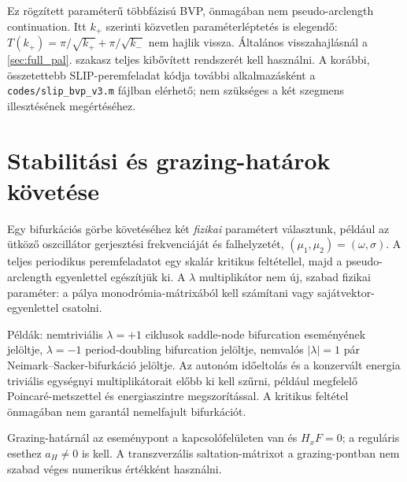 Ez rögzített paraméterű többfázisú BVP, önmagában nem pseudo-arclength continuation. Itt $k_+$ szerinti közvetlen paraméterléptetés is elegendő: $T(k_+)=\pi/\sqrt{k_+}+\pi/\sqrt{k_-}$ nem hajlik vissza. Általános visszahajlásnál a \ref{sec:full_pal}. szakasz teljes kibővített rendszerét kell használni. A korábbi, összetettebb SLIP-peremfeladat kódja további alkalmazásként a \texttt{codes/slip\_bvp\_v3.m} fájlban elérhető; nem szükséges a két szegmens illesztésének megértéséhez.
\exampleend

\section{Stabilitási és grazing-határok követése}
Egy bifurkációs görbe követéséhez két \emph{fizikai} paramétert választunk, például az ütköző oszcillátor gerjesztési frekvenciáját és falhelyzetét, $(\mu_1,\mu_2)=(\omega,\sigma)$. A teljes periodikus peremfeladatot egy skalár kritikus feltétellel, majd a pseudo-arclength egyenlettel egészítjük ki. A $\lambda$ multiplikátor nem új, szabad fizikai paraméter: a pálya monodrómia-mátrixából kell számítani vagy sajátvektor-egyenlettel csatolni.

Példák: nemtriviális $\lambda=+1$ ciklusok saddle-node bifurcation eseményének jelöltje, $\lambda=-1$ period-doubling bifurcation jelöltje, nemvalós $|\lambda|=1$ pár Neimark--Sacker-bifurkáció jelöltje. Az autonóm időeltolás és a konzervált energia triviális egységnyi multiplikátorait előbb ki kell szűrni, például megfelelő Poincaré-metszettel és energiaszintre megszorítással. A kritikus feltétel önmagában nem garantál nemelfajult bifurkációt.

Grazing-határnál az eseménypont a kapcsolófelületen van és $H_xF=0$; a reguláris esethez $a_H\neq0$ is kell. A transzverzális saltation-mátrixot a grazing-pontban nem szabad véges numerikus értékként használni.
